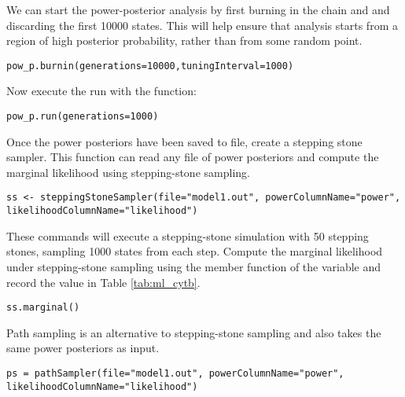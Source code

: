 We can start the power-posterior analysis by first burning in the chain and and discarding the first 10000 states.  
This will help ensure that analysis starts from a region of high posterior probability, rather than from some random point.
{\tt \begin{snugshade*}
\begin{lstlisting}
pow_p.burnin(generations=10000,tuningInterval=1000)
\end{lstlisting}
\end{snugshade*}}

Now execute the run with the  function:
{\tt \begin{snugshade*}
\begin{lstlisting}
pow_p.run(generations=1000)  
\end{lstlisting}
\end{snugshade*}}

Once the power posteriors have been saved to file, create a stepping stone sampler. 
This function can read any file of power posteriors and compute the marginal likelihood using stepping-stone sampling. 
{\tt \small \begin{snugshade*}
\begin{lstlisting}
ss <- steppingStoneSampler(file="model1.out", powerColumnName="power", likelihoodColumnName="likelihood")
\end{lstlisting}
\end{snugshade*}}

These commands will execute a stepping-stone simulation with 50 stepping stones, sampling 1000 states from each step. 
Compute the marginal likelihood under stepping-stone sampling using the member function  of the  variable and record the value in Table \ref{tab:ml_cytb}.
{\tt \begin{snugshade*}
\begin{lstlisting}
ss.marginal() 
\end{lstlisting}
\end{snugshade*}}

Path sampling is an alternative to stepping-stone sampling and also takes the same power posteriors as input. 
{\tt \small \begin{snugshade*}
\begin{lstlisting}
ps = pathSampler(file="model1.out", powerColumnName="power", likelihoodColumnName="likelihood")
\end{lstlisting}
\end{snugshade*}}


